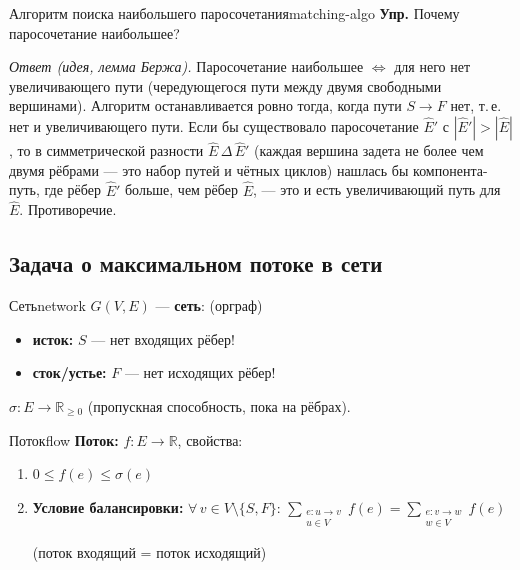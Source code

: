 \begin{algo}{Алгоритм поиска наибольшего паросочетания}{matching-algo}
\medskip
\textbf{Упр.} Почему паросочетание наибольшее?

\textit{Ответ (идея, лемма Бержа).} Паросочетание наибольшее
$\Leftrightarrow$ для него нет увеличивающего пути (чередующегося пути
между двумя свободными вершинами). Алгоритм останавливается ровно тогда,
когда пути $S \to F$ нет, т.\,е. нет и увеличивающего пути. Если бы
существовало паросочетание $\hat E'$ с $|\hat E'| > |\hat E|$, то в
симметрической разности $\hat E \,\Delta\, \hat E'$ (каждая вершина
задета не более чем двумя рёбрами --- это набор путей и чётных циклов)
нашлась бы компонента-путь, где рёбер $\hat E'$ больше, чем рёбер
$\hat E$, --- это и есть увеличивающий путь для $\hat E$. Противоречие.
\end{algo}


\subsection*{Задача о максимальном потоке в сети}

\begin{defn}{Сеть}{network}
$G(V, E)$ --- \textbf{сеть}: \quad (орграф)
\begin{itemize}
  \item \textbf{исток:} $S$ --- нет входящих рёбер!
  \item \textbf{сток/устье:} $F$ --- нет исходящих рёбер!
\end{itemize}

$\sigma\colon E \to \mathbb{R}_{\geq 0}$ \quad (пропускная способность, пока на рёбрах).
\end{defn}

\begin{defn}{Поток}{flow}
\textbf{Поток:} $f\colon E \to \mathbb{R}$, свойства:
\begin{enumerate}
  \item $0 \leq f(e) \leq \sigma(e)$
  \item \textbf{Условие балансировки:}
        $\forall\, v \in V \setminus \{S, F\}$:\;
        $\displaystyle\sum_{\substack{e\colon u \to v \\ u \in V}} f(e) = 
         \displaystyle\sum_{\substack{e\colon v \to w \\ w \in V}} f(e)$

        \quad (поток входящий = поток исходящий)
\end{enumerate}
\end{defn}


